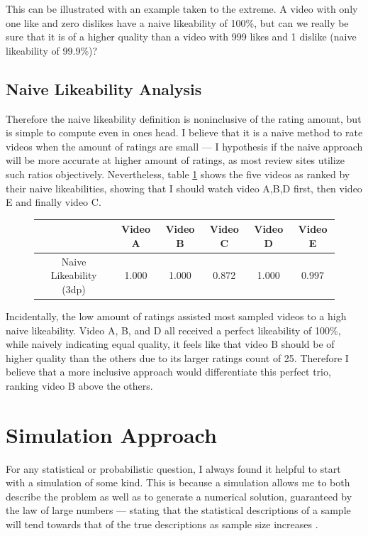 \documentclass[a4paper,11pt]{article}
\begin{document}
This can be illustrated with an example taken to the extreme. A video with only one like and zero dislikes have a naive likeability of 100\%, but can we really be sure that it is of a higher quality than a video with 999 likes and 1 dislike (naive likeability of 99.9\%)?

\subsection{Naive Likeability Analysis}
Therefore the naive likeability definition is noninclusive of the rating amount, but is simple to compute even in ones head. I believe that it is a naive method to rate videos when the amount of ratings are small --- I hypothesis if the naive approach will be more accurate at higher amount of ratings, as most review sites utilize such ratios objectively. Nevertheless, table \ref{tbl:naive} shows the five videos as ranked by their naive likeabilities, showing that I should watch video A,B,D first, then video E and finally video C.

\begin{figure}[H]
    \centering
    \begin{tabular}{c|c|c|c|c|c}
        & Video A & Video B & Video C & Video D & Video E \\
        \hline
        \hline
        Naive Likeability (3dp) & 1.000 & 1.000 & 0.872 & 1.000 & 0.997
    \end{tabular}
    \label{tbl:naive}
\end{figure}

Incidentally, the low amount of ratings assisted most sampled videos to a high naive likeability. Video A, B, and D all received a perfect likeability of 100\%, while naively indicating equal quality, it feels like that video B should be of higher quality than the others due to its larger ratings count of 25. Therefore I believe that a more inclusive approach would differentiate this perfect trio, ranking video B above the others.


\section{Simulation Approach}
For any statistical or probabilistic question, I always found it helpful to start with a simulation of some kind. This is because a simulation allows me to both describe the problem as well as to generate a numerical solution, guaranteed by the law of large numbers --- stating that the statistical descriptions of a sample will tend towards that of the true descriptions as sample size increases \parencite{dekking_kraaikamp_lopuhaä_meester_2005}.
\end{document}
